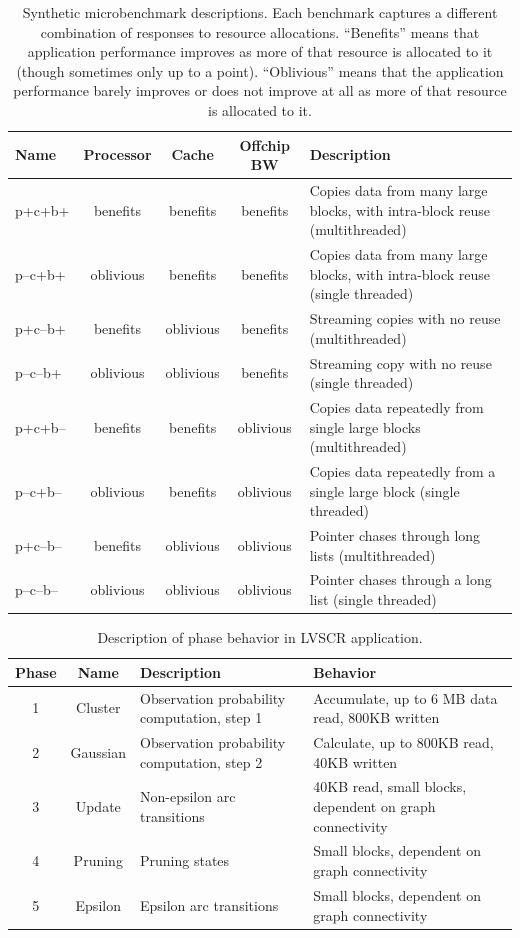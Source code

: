 \begin{table}[t]
\begin{tabular}{|l|c|c|c|l|}
\hline
 Name  & Processor  &  Cache &  Offchip BW & Description \\ \hline
 p+c+b+ & benefits & benefits & benefits &  Copies data from many large blocks, with intra-block reuse (multithreaded)\\ \hline
p--c+b+ & oblivious & benefits & benefits &  Copies data from many large blocks, with intra-block reuse (single threaded)\\ \hline
p+c--b+ & benefits & oblivious & benefits &  Streaming copies with no reuse (multithreaded)\\ \hline
p--c--b+ & oblivious & oblivious & benefits &  Streaming copy with no reuse (single threaded)\\ \hline
p+c+b-- & benefits & benefits & oblivious &  Copies data repeatedly from single large blocks (multithreaded)\\ \hline
p--c+b-- & oblivious & benefits & oblivious &  Copies data repeatedly from a single large block (single threaded)\\ \hline
p+c--b-- & benefits & oblivious & oblivious &  Pointer chases through long lists (multithreaded)\\ \hline
p--c--b-- & oblivious & oblivious & oblivious &  Pointer chases through a long list (single threaded)\\ \hline
\end{tabular}
\caption{Synthetic microbenchmark descriptions. Each benchmark captures a different combination of responses to resource allocations.  ``Benefits'' means that application performance improves as more of that resource is allocated to it (though sometimes only up to a point).  ``Oblivious'' means that the application performance barely improves or does not improve at all as more of that resource is allocated to it.}
\label{table:benchmarks1}
\end{table}

\begin{table}[t]
\footnotesize
\begin{tabular}{|c|c|l|l|}
\hline
 Phase  & Name & Description & Behavior \\ \hline
 1 & Cluster  & Observation probability computation, step 1 &  Accumulate, up to 6 MB data read, 800KB written\\ \hline
 2 & Gaussian  & Observation probability computation, step 2 &  Calculate, up to 800KB read, 40KB written\\ \hline
 3 & Update & Non-epsilon arc transitions &40KB read, small blocks, dependent on graph connectivity\\ \hline
 4 & Pruning & Pruning states & Small blocks, dependent on graph connectivity\\ \hline
 5 & Epsilon & Epsilon arc transitions & Small blocks, dependent on graph connectivity\\ \hline
\end{tabular}
\caption{Description of phase behavior in LVSCR application.}
\label{table:app}
\end{table}

